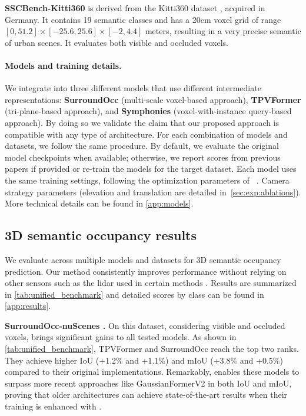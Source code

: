 \textbf{SSCBench-Kitti360} \cite{li2024sscbench} is derived from the Kitti360 dataset \cite{Liao2022PAMI}, acquired in Germany. 
{It contains 19 semantic classes and has a 20cm voxel grid of range $[0,51.2] \! \times \! [-25.6,25.6] \! \times \! [-2,4.4]$ meters, resulting in a very precise semantic of urban scenes.}
{It evaluates both visible and occluded voxels.}


\paragraph{Models and training details.}
We {integrate} \method{} into three different models that use different intermediate representations: \textbf{SurroundOcc} \cite{wei2023surroundocc} (multi-scale voxel-based approach), \textbf{TPVFormer} \cite{huang2023tpv} (tri-plane-based approach), and \textbf{Symphonies} \cite{jiang2024symphonies} (voxel-with-instance query-based approach).
By doing so we validate the claim that our proposed approach is compatible with any type of architecture.
For each combination of models and datasets, we follow the same procedure. {By default, we evaluate the original model checkpoints when available; otherwise, we report scores from previous papers if provided or re-train the models for the target dataset}. Each model uses the same training settings, following the optimization parameters of ~\cite{wei2023surroundocc}. 
{
Camera strategy parameters (elevation and translation are detailed in~\autoref{sec:exp:ablations}).
}
More {technical} details can be found in \autoref{app:models}.

\subsection{3D semantic occupancy results} %
\label{sec:exp:sota}




We evaluate \method{} across multiple models \citep{wei2023surroundocc,huang2023tpv,jiang2024symphonies} and datasets \citep{wei2023surroundocc,tian2023occ3d,li2024sscbench} for 3D semantic occupancy prediction. Our method consistently improves performance without {relying on} other sensors such as the lidar used in certain methods \cite{pan2024renderocc, sun2024gsrender}. Results are summarized in \autoref{tab:unified_benchmark} and detailed scores by class can be found in \autoref{app:results}.

\textbf{SurroundOcc-nuScenes \citep{wei2023surroundocc}.}
On {this dataset}, considering visible and occluded voxels, \method{} brings significant gains to all tested models. As shown in \autoref{tab:unified_benchmark}, TPVFormer \cite{huang2023tpv} and SurroundOcc \cite{wei2023surroundocc} reach the top two ranks. They achieve higher IoU (+1.2\% and +1.1\%) and mIoU (+3.8\% and +0.5\%) compared to their original implementations.
Remarkably, \method{} enables these models to surpass {more} recent approaches like GaussianFormerV2 \cite{huang2024gaussianformer2} in both IoU and mIoU, proving that older architectures can achieve state-of-the-art results when {their training is enhanced with \method{}.}

